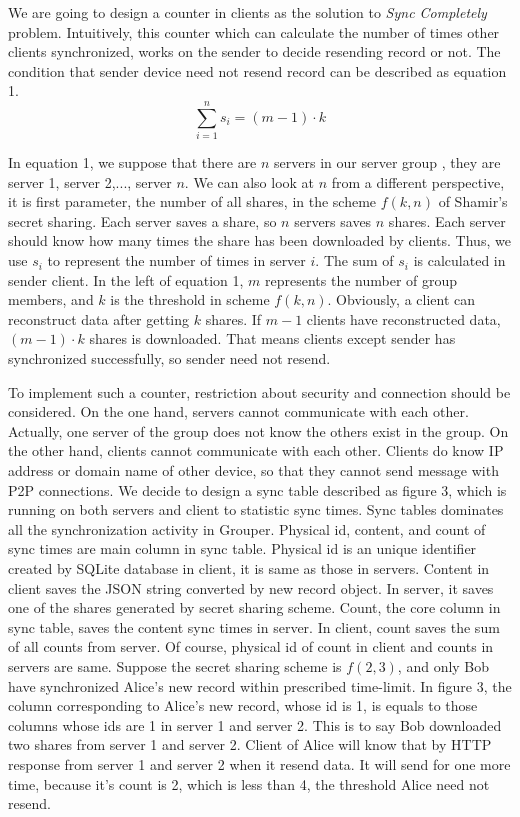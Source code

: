 \documentclass[twocolumn,10pt]{article}
\begin{document}
We are going to design a counter in clients as the solution to \emph{Sync Completely} problem. Intuitively, this counter which can calculate the number of times other clients synchronized, works on the sender to decide resending record or not. The condition that sender device need not resend record can be described as equation 1.
\begin{equation}
\sum_{i=1}^{n}s_{i}=(m-1)\cdot k
\end{equation}

In equation 1, we suppose that there are $n$ servers in our server group , they are server 1, server 2,..., server $n$. We can also look at $n$ from a different perspective, it is first parameter, the number of all shares, in the scheme $f(k, n)$ of Shamir's secret sharing. Each server saves a share, so $n$ servers saves $n$ shares. Each server should know how many times the share has been downloaded by clients. Thus, we use $s_i$ to represent the number of times in server $i$. The sum of $s_i$ is calculated in sender client. In the left of equation 1, $m$ represents the number of group members, and $k$ is the threshold in scheme $f(k, n)$. Obviously, a client can reconstruct data after getting $k$ shares. If $m-1$ clients have reconstructed data, $(m-1)\cdot k$ shares is downloaded. That means clients except sender has synchronized successfully, so sender need not resend.

To implement such a counter, restriction about security and connection should be considered. On the one hand, servers cannot communicate with each other. Actually, one server of the group does not know the others exist in the group. On the other hand, clients cannot communicate with each other. Clients do know IP address or domain name of other device, so that they cannot send message with P2P connections. We decide to design a sync table described as figure 3, which is running on both servers and client to statistic sync times. Sync tables dominates all the synchronization activity in Grouper. Physical id, content, and count of sync times are main column in sync table. Physical id is an unique identifier created by SQLite database in client, it is same as those in servers. Content in client saves the JSON string converted by new record object. In server, it saves one of the shares generated by secret sharing scheme. Count, the core column in sync table, saves the content sync times in server. In client, count saves the sum of all counts from server. Of course, physical id of count in client and counts in servers are same. Suppose the secret sharing scheme is $f(2, 3)$, and only Bob have synchronized Alice's new record within prescribed time-limit. In figure 3, the column corresponding to Alice's new record, whose id is 1, is equals to those columns whose ids are 1 in server 1 and server 2. This is to say Bob downloaded two shares from server 1 and server 2. Client of Alice will know that by HTTP response from server 1 and server 2 when it resend data. It will send for one more time, because it's count is 2, which is less than 4, the threshold Alice need not resend.
\end{document}
